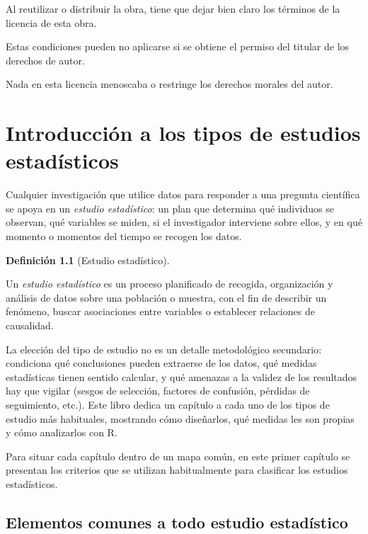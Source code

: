 \documentclass[
  spanish,
  a4paper,
]{scrreport}
\theoremstyle{definition}
\theoremstyle{definition}
\newtheorem{definition}{Definición}[chapter]
\theoremstyle{remark}
\begin{document}
Al reutilizar o distribuir la obra, tiene que dejar bien claro los
términos de la licencia de esta obra.

Estas condiciones pueden no aplicarse si se obtiene el permiso del
titular de los derechos de autor.

Nada en esta licencia menoscaba o restringe los derechos morales del
autor.


\chapter{Introducción a los tipos de estudios
estadísticos}\label{introducciuxf3n-a-los-tipos-de-estudios-estaduxedsticos}

Cualquier investigación que utilice datos para responder a una pregunta
científica se apoya en un \emph{estudio estadístico}: un plan que
determina qué individuos se observan, qué variables se miden, si el
investigador interviene sobre ellos, y en qué momento o momentos del
tiempo se recogen los datos.

\begin{definition}[Estudio
estadístico]\protect\hypertarget{def-estudio-estadistico}{}\label{def-estudio-estadistico}

Un \emph{estudio estadístico} es un proceso planificado de recogida,
organización y análisis de datos sobre una población o muestra, con el
fin de describir un fenómeno, buscar asociaciones entre variables o
establecer relaciones de causalidad.

\end{definition}

La elección del tipo de estudio no es un detalle metodológico
secundario: condiciona qué conclusiones pueden extraerse de los datos,
qué medidas estadísticas tienen sentido calcular, y qué amenazas a la
validez de los resultados hay que vigilar (sesgos de selección, factores
de confusión, pérdidas de seguimiento, etc.). Este libro dedica un
capítulo a cada uno de los tipos de estudio más habituales, mostrando
cómo diseñarlos, qué medidas les son propias y cómo analizarlos con R.

Para situar cada capítulo dentro de un mapa común, en este primer
capítulo se presentan los criterios que se utilizan habitualmente para
clasificar los estudios estadísticos.

\section{Elementos comunes a todo estudio
estadístico}\label{elementos-comunes-a-todo-estudio-estaduxedstico}
\end{document}

